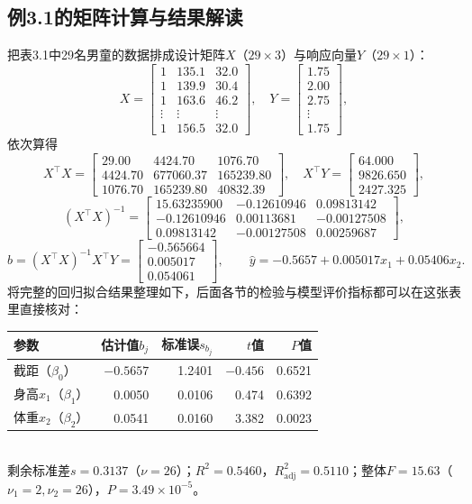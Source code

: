 \subsection{例3.1的矩阵计算与结果解读}
把表3.1中29名男童的数据排成设计矩阵$X$（$29\times 3$）与响应向量$Y$（$29\times 1$）：
\[
X=\begin{bmatrix}1&135.1&32.0\\1&139.9&30.4\\1&163.6&46.2\\\vdots&\vdots&\vdots\\1&156.5&32.0\end{bmatrix},
\quad Y=\begin{bmatrix}1.75\\2.00\\2.75\\\vdots\\1.75\end{bmatrix},
\]
依次算得
\[
X^\top X=\begin{bmatrix}
29.00&4424.70&1076.70\\
4424.70&677060.37&165239.80\\
1076.70&165239.80&40832.39
\end{bmatrix},\quad
X^\top Y=\begin{bmatrix}64.000\\9826.650\\2427.325\end{bmatrix},
\]
\[
(X^\top X)^{-1}=\begin{bmatrix}
15.63235900&-0.12610946&0.09813142\\
-0.12610946&0.00113681&-0.00127508\\
0.09813142&-0.00127508&0.00259687
\end{bmatrix},
\]
\[
b=(X^\top X)^{-1}X^\top Y=\begin{bmatrix}-0.565664\\0.005017\\0.054061\end{bmatrix},
\qquad \widehat y=-0.5657+0.005017x_1+0.05406x_2.
\]
将完整的回归拟合结果整理如下，后面各节的检验与模型评价指标都可以在这张表里直接核对：
\begin{center}\small
\begin{tabular}{lrrrr}
\toprule 参数&估计值$b_j$&标准误$s_{b_j}$&$t$值&$P$值\\\midrule
截距（$\beta_0$）&$-0.5657$&1.2401&$-0.456$&0.6521\\
身高$x_1$（$\beta_1$）&0.0050&0.0106&0.474&0.6392\\
体重$x_2$（$\beta_2$）&0.0541&0.0160&3.382&0.0023\\\bottomrule
\end{tabular}\\[4pt]
{\footnotesize 剩余标准差$s=0.3137$（$\nu=26$）；$R^2=0.5460$，$R^2_{\mathrm{adj}}=0.5110$；整体$F=15.63$（$\nu_1=2,\nu_2=26$），$P=3.49\times10^{-5}$。}
\end{center}

